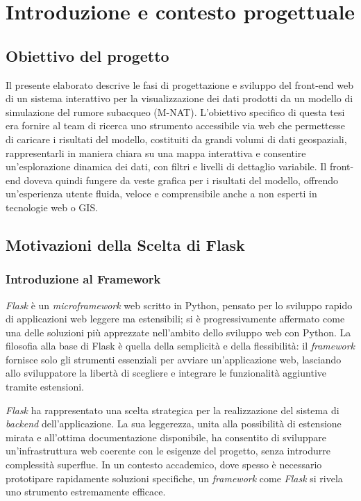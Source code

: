 \chapter{Introduzione e contesto progettuale}
\label{ch:introduzione}

\section{Obiettivo del progetto}

Il presente elaborato descrive le fasi di progettazione e sviluppo del front-end
web di un sistema interattivo per la visualizzazione dei dati prodotti da un modello
di simulazione del rumore subacqueo (M-NAT). L'obiettivo specifico di questa
tesi era fornire al team di ricerca uno strumento accessibile via web che
permettesse di caricare i risultati del modello, costituiti da grandi volumi di dati
geospaziali, rappresentarli in maniera chiara su una mappa interattiva e
consentire un'esplorazione dinamica dei dati, con filtri e livelli di dettaglio variabile.
Il front-end doveva quindi fungere da veste grafica per i risultati del modello,
offrendo un'esperienza utente fluida, veloce e comprensibile anche a non esperti
in tecnologie web o GIS.


\section{Motivazioni della Scelta di Flask}
\label{ch:flask}

\subsection{Introduzione al Framework}
\textit{Flask} è un \textit{microframework} web scritto in Python, pensato per lo
sviluppo rapido di applicazioni web leggere ma estensibili; si è
progressivamente affermato come una delle soluzioni più apprezzate nell'ambito
dello sviluppo web con Python. La filosofia alla base di Flask è quella della semplicità
e della flessibilità: il \textit{framework} fornisce solo gli strumenti essenziali
per avviare un'applicazione web, lasciando allo sviluppatore la libertà di
scegliere e integrare le funzionalità aggiuntive tramite estensioni. \cite{flask-docs}

\textit{Flask} ha rappresentato una scelta strategica per la realizzazione del sistema
di \textit{backend} dell'applicazione. La sua leggerezza, unita alla possibilità
di estensione mirata e all'ottima documentazione disponibile, ha consentito di sviluppare
un'infrastruttura web coerente con le esigenze del progetto, senza introdurre
complessità superflue. In un contesto accademico, dove spesso è necessario
prototipare rapidamente soluzioni specifiche, un \textit{framework} come \textit{Flask}
si rivela uno strumento estremamente efficace.

